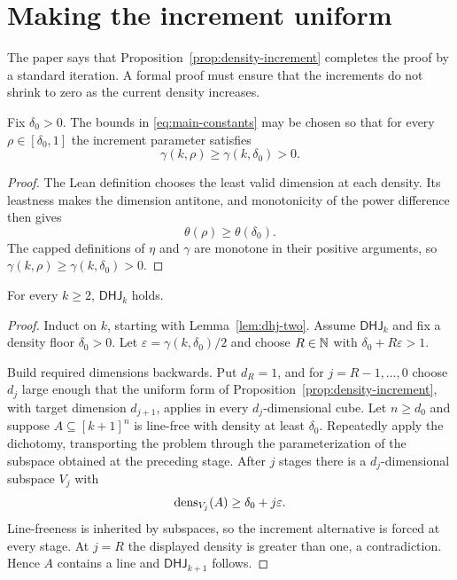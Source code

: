 \section{Making the increment uniform}

The paper says that Proposition~\ref{prop:density-increment} completes the proof by a standard
iteration.  A formal proof must ensure that the increments do not shrink to zero as the current
density increases.

\begin{lemma}
\label{lem:uniform-gamma}
Fix $\delta_0>0$.  The bounds in \eqref{eq:main-constants} may be chosen so that for every
$\rho\in[\delta_0,1]$ the increment parameter satisfies
\[
  \gamma(k,\rho)\geq\gamma(k,\delta_0)>0.
\]
\end{lemma}

\begin{proof}
The Lean definition chooses the least valid dimension at each density.  Its leastness makes the
dimension antitone, and monotonicity of the power difference then gives
\[
 \theta(\rho)\geq
 \theta(\delta_0).
\]
The capped definitions of $\eta$ and $\gamma$ are monotone in their positive arguments, so
$\gamma(k,\rho)\geq\gamma(k,\delta_0)>0$.
\end{proof}

\begin{theorem}
\label{thm:dhj-induction}
For every $k\geq2$, $\mathsf{DHJ}_k$ holds.
\end{theorem}

\begin{proof}
Induct on $k$, starting with Lemma~\ref{lem:dhj-two}.  Assume $\mathsf{DHJ}_k$ and fix a density
floor $\delta_0>0$.  Let $\varepsilon=\gamma(k,\delta_0)/2$ and choose
$R\in\mathbb{N}$ with $\delta_0+R\varepsilon>1$.

Build required dimensions backwards.  Put $d_R=1$, and for $j=R-1,\ldots,0$ choose $d_j$ large
enough that the uniform form of Proposition~\ref{prop:density-increment}, with target dimension
$d_{j+1}$, applies in every $d_j$-dimensional cube.  Let $n\geq d_0$ and suppose
$A\subseteq[k+1]^n$ is line-free with density at least $\delta_0$.  Repeatedly apply the dichotomy,
transporting the problem through the parameterization of the subspace obtained at the preceding
stage.  After $j$ stages there is a $d_j$-dimensional subspace $V_j$ with
\[
  \operatorname{dens}_{V_j}(A)\geq\delta_0+j\varepsilon.
\]
Line-freeness is inherited by subspaces, so the increment alternative is forced at every stage.
At $j=R$ the displayed density is greater than one, a contradiction.  Hence $A$ contains a line
and $\mathsf{DHJ}_{k+1}$ follows.
\end{proof}

